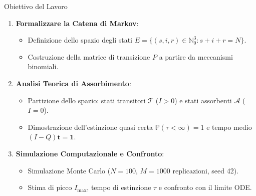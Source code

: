 \documentclass[10pt, aspectratio=169]{beamer}
\begin{document}
\begin{frame}{Obiettivo del Lavoro}
    \begin{enumerate}
        \item \textbf{Formalizzare la Catena di Markov}:
        \begin{itemize}
            \item Definizione dello spazio degli stati $E = \{(s,i,r) \in \mathbb{N}_0^3 : s+i+r=N\}$.
            \item Costruzione della matrice di transizione $P$ a partire da meccanismi binomiali.
        \end{itemize}
        \vspace{0.2cm}
        \item \textbf{Analisi Teorica di Assorbimento}:
        \begin{itemize}
            \item Partizione dello spazio: stati transitori $\mathcal{T}$ ($I>0$) e stati assorbenti $\mathcal{A}$ ($I=0$).
            \item Dimostrazione dell'estinzione quasi certa $\mathbb{P}(\tau < \infty) = 1$ e tempo medio $(I-Q)\mathbf{t}=\mathbf{1}$.
        \end{itemize}
        \vspace{0.2cm}
        \item \textbf{Simulazione Computazionale e Confronto}:
        \begin{itemize}
            \item Simulazione Monte Carlo ($N=100$, $M=1000$ replicazioni, seed 42).
            \item Stima di picco $I_{\max}$, tempo di estinzione $\tau$ e confronto con il limite ODE.
        \end{itemize}
    \end{enumerate}

\end{frame}
\end{document}
